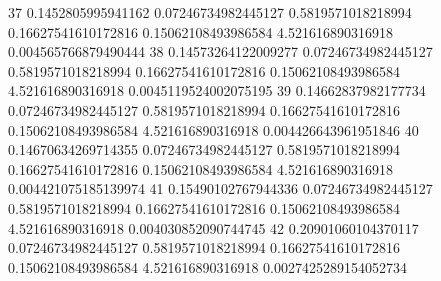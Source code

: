 {37 0.1452805995941162 0.07246734982445127 0.5819571018218994 0.16627541610172816 0.15062108493986584 4.521616890316918 0.004565766879490444
38 0.14573264122009277 0.07246734982445127 0.5819571018218994 0.16627541610172816 0.15062108493986584 4.521616890316918 0.0045119524002075195
39 0.14662837982177734 0.07246734982445127 0.5819571018218994 0.16627541610172816 0.15062108493986584 4.521616890316918 0.004426643961951846
40 0.14670634269714355 0.07246734982445127 0.5819571018218994 0.16627541610172816 0.15062108493986584 4.521616890316918 0.004421075185139974
41 0.15490102767944336 0.07246734982445127 0.5819571018218994 0.16627541610172816 0.15062108493986584 4.521616890316918 0.004030852090744745
42 0.20901060104370117 0.07246734982445127 0.5819571018218994 0.16627541610172816 0.15062108493986584 4.521616890316918 0.0027425289154052734
}\tableexpivwaitnetmnist
